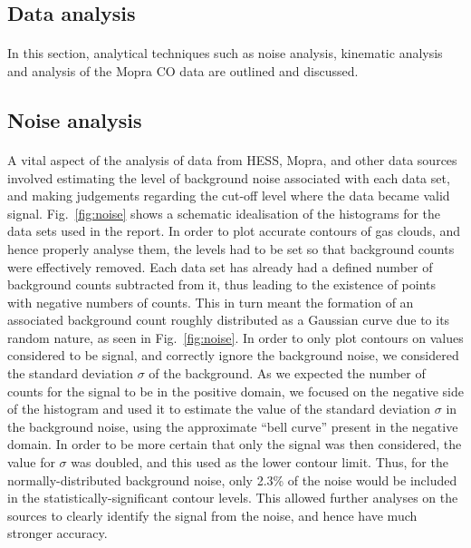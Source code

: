 \documentclass[a4paper, titlepage, oneside]{article}
\begin{document}
\begin{multicols}{2}
\section{Data analysis}
\paragraph{}
In this section, analytical techniques such as noise analysis, kinematic analysis and analysis of the Mopra CO data are outlined and discussed.

\subsection{Noise analysis}
\paragraph{}
A vital aspect of the analysis of data from HESS, Mopra, and other data sources involved estimating the level of background noise associated with each data set, and making judgements regarding the cut-off level where the data became valid signal. Fig.~\ref{fig:noise} shows a schematic idealisation of the histograms for the data sets used in the report. In order to plot accurate contours of gas clouds, and hence properly analyse them, the levels had to be set so that background counts were effectively removed. Each data set has already had a defined number of background counts subtracted from it, thus leading to the existence of points with negative numbers of counts. This in turn meant the formation of an associated background count roughly distributed as a Gaussian curve due to its random nature, as seen in Fig.~\ref{fig:noise}. In order to only plot contours on values considered to be signal, and correctly ignore the background noise, we considered the standard deviation \(\sigma\) of the background. As we expected the number of counts for the signal to be in the positive domain, we focused on the negative side of the histogram and used it to estimate the value of the standard deviation \(\sigma\) in the background noise, using the approximate ``bell curve'' present in the negative domain. In order to be more certain that only the signal was then considered, the value for \(\sigma\) was doubled, and this used as the lower contour limit. Thus, for the normally-distributed background noise, only 2.3\% of the noise would be included in the statistically-significant contour levels. This allowed further analyses on the sources to clearly identify the signal from the noise, and hence have much stronger accuracy.


\end{multicols}
\end{document}
